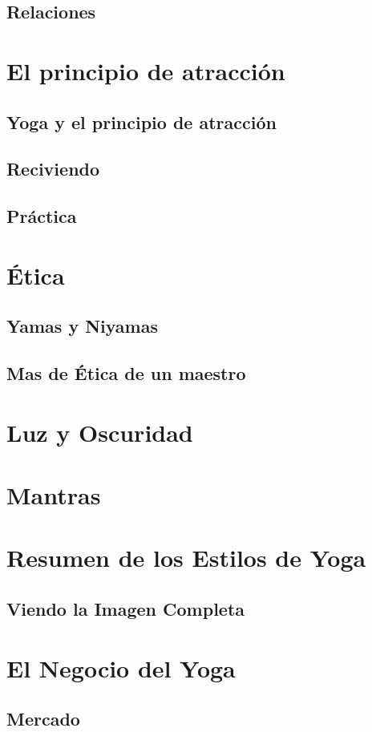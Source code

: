 \documentclass[11pt]{book}
\begin{document}
\subsection{Relaciones}
\section{El principio de atracción}
\subsection{Yoga y el principio de atracción}
\subsection{Reciviendo}
\subsection{Práctica}
\section{Ética}
\subsection{Yamas y Niyamas}
\subsection{Mas de Ética de un maestro}
\section{Luz y Oscuridad}
\section{Mantras}
\section{Resumen de los Estilos de Yoga}
\subsection{Viendo la Imagen Completa}
\section{El Negocio del Yoga}
\subsection{Mercado}
\end{document}
